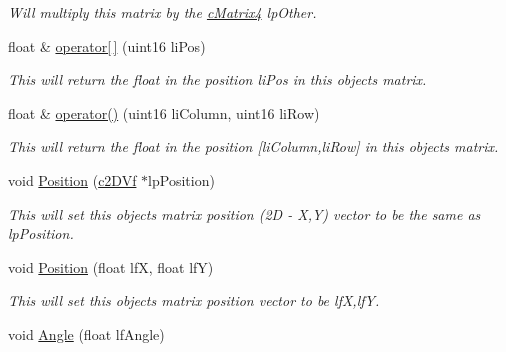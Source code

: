 \begin{DoxyCompactItemize}
\begin{DoxyCompactList}\small\item\em Will multiply this matrix by the \hyperlink{classc_matrix4}{cMatrix4} lpOther. \end{DoxyCompactList}\item 
\hypertarget{classc_camera_matrix4_ad9cd70439ad670a7ecc0e9198b5e0516}{
float \& \hyperlink{classc_camera_matrix4_ad9cd70439ad670a7ecc0e9198b5e0516}{operator\mbox{[}$\,$\mbox{]}} (uint16 liPos)}
\label{classc_camera_matrix4_ad9cd70439ad670a7ecc0e9198b5e0516}

\begin{DoxyCompactList}\small\item\em This will return the float in the position liPos in this objects matrix. \end{DoxyCompactList}\item 
\hypertarget{classc_camera_matrix4_a47de224c654b31aa8c22e55ec1d58ed0}{
float \& \hyperlink{classc_camera_matrix4_a47de224c654b31aa8c22e55ec1d58ed0}{operator()} (uint16 liColumn, uint16 liRow)}
\label{classc_camera_matrix4_a47de224c654b31aa8c22e55ec1d58ed0}

\begin{DoxyCompactList}\small\item\em This will return the float in the position \mbox{[}liColumn,liRow\mbox{]} in this objects matrix. \end{DoxyCompactList}\item 
\hypertarget{classc_camera_matrix4_a62fa2879539cc733e661d02b8a898578}{
void \hyperlink{classc_camera_matrix4_a62fa2879539cc733e661d02b8a898578}{Position} (\hyperlink{classc2_d_vf}{c2DVf} $\ast$lpPosition)}
\label{classc_camera_matrix4_a62fa2879539cc733e661d02b8a898578}

\begin{DoxyCompactList}\small\item\em This will set this objects matrix position (2D -\/ X,Y) vector to be the same as lpPosition. \end{DoxyCompactList}\item 
\hypertarget{classc_camera_matrix4_a293ac7d2919eae7205b568ea56fa104c}{
void \hyperlink{classc_camera_matrix4_a293ac7d2919eae7205b568ea56fa104c}{Position} (float lfX, float lfY)}
\label{classc_camera_matrix4_a293ac7d2919eae7205b568ea56fa104c}

\begin{DoxyCompactList}\small\item\em This will set this objects matrix position vector to be lfX,lfY. \end{DoxyCompactList}\item 
\hypertarget{classc_camera_matrix4_a6be0f1f82cc4ee5a5953cb3b569b4285}{
void \hyperlink{classc_camera_matrix4_a6be0f1f82cc4ee5a5953cb3b569b4285}{Angle} (float lfAngle)}
\label{classc_camera_matrix4_a6be0f1f82cc4ee5a5953cb3b569b4285}


\end{DoxyCompactItemize}
